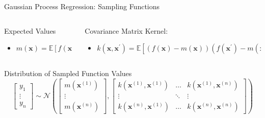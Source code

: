 \documentclass[10pt, compress, aspectratio=169, xcolor={table,usenames,dvipsnames}]{beamer}
\begin{document}
\begin{frame}[label={sec:org98ca458}]{Gaussian Process Regression: Sampling Functions}
\begin{columns}
\begin{column}{0.5\columnwidth}
\begin{block}{Expected Values}
\begin{itemize}
\item \(m(\mathbf{x}) = \mathbb{E}[f(\mathbf{x})]\)
\end{itemize}
\end{block}
\end{column}

\begin{column}{0.5\columnwidth}
\begin{block}{Covariance Matrix}
\alert{Kernel}:
\begin{itemize}
\item \(k(\mathbf{x},\mathbf{x^\prime}) = \mathbb{E}[(f(\mathbf{x}) - m(\mathbf{x}))(f(\mathbf{x^\prime}) - m(\mathbf{x^\prime}))]\)
\end{itemize}
\end{block}
\end{column}
\end{columns}
\begin{block}{Distribution of Sampled Function Values}
\begin{equation*}
  \begin{bmatrix} y_1 \\ \vdots \\ y_n \end{bmatrix} \sim \mathcal{N}\left(
  \begin{bmatrix} m(\mathbf{x}^{(1)}) \\ \vdots \\ m(\mathbf{x}^{(n)}) \end{bmatrix},
  \begin{bmatrix} k(\mathbf{x}^{(1)},\mathbf{x}^{(1)}) & \dots & k(\mathbf{x}^{(1)},\mathbf{x}^{(n)}) \\
    \vdots & \ddots & \vdots \\
    k(\mathbf{x}^{(n)},\mathbf{x}^{(1)}) & \dots & k(\mathbf{x}^{(n)},\mathbf{x}^{(n)})
  \end{bmatrix}\right)
\end{equation*}
\end{block}
\end{frame}
\end{document}

